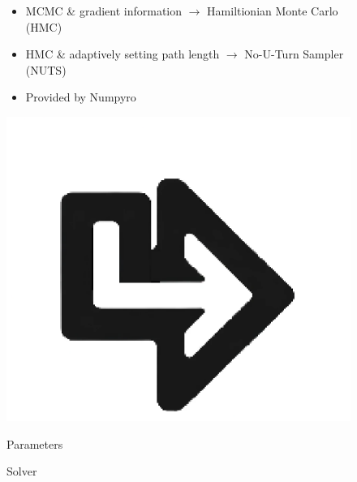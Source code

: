\documentclass[compress]{beamer}
\begin{document}
\begin{frame}
\begin{figure}[]
\begin{minipage}[c][0.33\paperheight][c]{\linewidth}
{\begin{minipage}{0.1\linewidth}
				\end{minipage}
				\hfill
				\begin{minipage}{0.58\linewidth}
					{\footnotesize \begin{itemize} 
							\item MCMC \& gradient information $\rightarrow$ Hamiltionian Monte Carlo (HMC)
							\item HMC \& adaptively setting path length $\rightarrow$ No-U-Turn Sampler (NUTS)
							\item Provided by Numpyro
					\end{itemize}}
				\end{minipage}
				\hfill
				\begin{minipage}{0.1\linewidth}
					\includegraphics[angle=180, width=\linewidth]{images/left_turn_arrow.eps}
			\end{minipage}}
		\end{minipage}
		\vfill
		\begin{minipage}[t][0.06\paperheight][t]{\linewidth}
			\begin{minipage}{0.18\linewidth}
				\caption*{\tiny Parameters}
			\end{minipage}
			\hfill
			\begin{minipage}{0.1\linewidth}
				\caption*{\tiny}
			\end{minipage}
			\hfill
			\begin{minipage}{0.18\linewidth}
				\caption*{\tiny Solver}
			\end{minipage}

\end{minipage}
\end{figure}
\end{frame}
\end{document}
